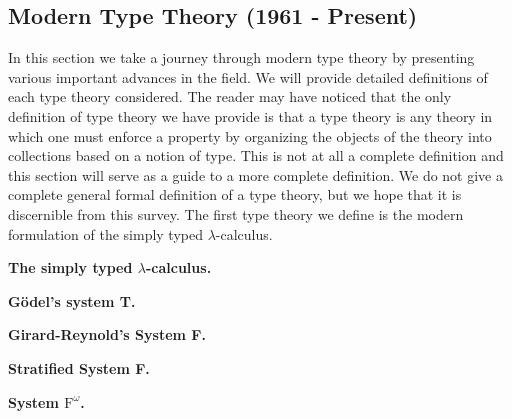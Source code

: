 \subsection{Modern Type Theory (1961 - Present)}
\label{subsec:moderen_type_theory}
In this section we take a journey through modern type theory by
presenting various important advances in the field.  We will provide
detailed definitions of each type theory considered.  The reader may
have noticed that the only definition of type theory we have provide
is that a type theory is any theory in which one must enforce a
property by organizing the objects of the theory into collections
based on a notion of type.  This is not at all a complete definition
and this section will serve as a guide to a more complete definition.
We do not give a complete general formal definition of a type theory,
but we hope that it is discernible from this survey.  The first type
theory we define is the modern formulation of the simply typed
$\lambda$-calculus.

\textbf{The simply typed $\lambda$-calculus.} 


\textbf{G\"odel's system T.} 

\textbf{Girard-Reynold's System F.} 

\textbf{Stratified System F.} 

\textbf{System $\text{F}^\omega$.}   

